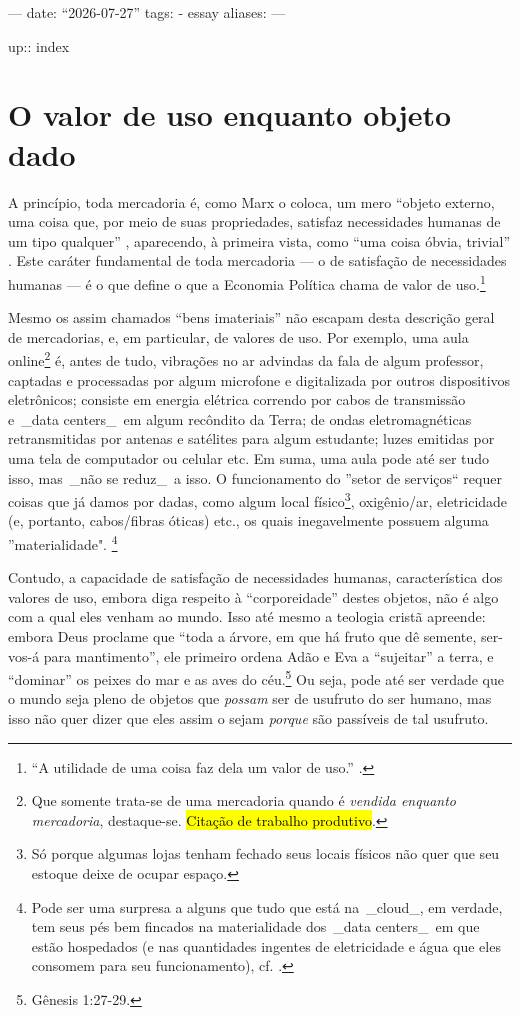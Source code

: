 ---
date: ``2026-07-27''
tags:
  - essay
aliases:
---

up:: index

\section{O valor de uso enquanto objeto dado}
A princípio, toda mercadoria é, como Marx o coloca, um mero ``objeto externo, uma coisa que, por meio de suas propriedades, satisfaz necessidades humanas de um tipo qualquer'' \parencite[p. 113]{Marx2017}, aparecendo, à primeira vista, como ``uma coisa óbvia, trivial'' \parencite[p. 146]{Marx2017}. Este caráter fundamental de toda mercadoria — o de satisfação de necessidades humanas — é o que define o que a Economia Política chama de valor de uso.\footnote{``A utilidade de uma coisa faz dela um valor de uso.'' \parencite[p. 114]{Marx2017}.}

Mesmo os assim chamados ``bens imateriais'' não escapam desta descrição geral de mercadorias, e, em particular, de valores de uso. Por exemplo, uma aula online\footnote{Que somente trata-se de uma mercadoria quando é \textit{vendida enquanto mercadoria}, destaque-se. \hl{Citação de trabalho produtivo}.} é, antes de tudo, vibrações no ar advindas da fala de algum professor, captadas e processadas por algum microfone e digitalizada por outros dispositivos eletrônicos; consiste em energia elétrica correndo por cabos de transmissão e _data centers_ em algum recôndito da Terra; de ondas eletromagnéticas retransmitidas por antenas e satélites para algum estudante; luzes emitidas por uma tela de computador ou celular etc. Em suma, uma aula pode até ser tudo isso, mas _não se reduz_ a isso. O funcionamento do ''setor de serviços`` requer coisas que já damos por dadas, como algum local físico\footnote{Só porque algumas lojas tenham fechado seus locais físicos não quer que seu estoque deixe de ocupar espaço.}, oxigênio/ar, eletricidade (e, portanto, cabos/fibras óticas) etc., os quais inegavelmente possuem alguma ''materialidade". \footnote{Pode ser uma surpresa a alguns que tudo que está na _cloud_, em verdade, tem seus pés bem fincados na materialidade dos _data centers_ em que estão hospedados (e nas quantidades ingentes de eletricidade e água que eles consomem para seu funcionamento), cf. \textcite{Monserrate2022}.}

Contudo, a capacidade de satisfação de necessidades humanas, característica dos valores de uso, embora diga respeito à ``corporeidade'' destes objetos, não é algo com a qual eles venham ao mundo. Isso até mesmo a teologia cristã apreende: embora Deus proclame que ``toda a árvore, em que há fruto que dê semente, ser-vos-á para mantimento'', ele primeiro ordena Adão e Eva a ``sujeitar'' a terra, e ``dominar'' os peixes do mar e as aves do céu.\footnote{Gênesis 1:27-29.} Ou seja, pode até ser verdade que o mundo seja pleno de objetos que \textit{possam} ser de usufruto do ser humano, mas isso não quer dizer que eles assim o sejam \textit{porque} são passíveis de tal usufruto. 

